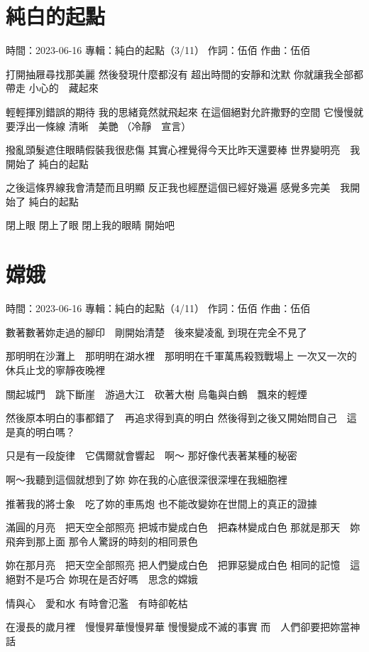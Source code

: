 \documentclass[UTF8,a4paper,oneside,twocolumn,12pt]{ctexbook}
\newcommand{\infopair}[2]{\textbullet #1：#2}
\newcommand{\zc}[1][伍佰]{\infopair{作詞}{#1}}
\newcommand{\zq}[1][伍佰]{\infopair{作曲}{#1}}
\newcommand{\zj}[1]{\infopair{專輯}{#1}}
\newcommand{\sj}[1]{\infopair{時間}{#1}}
\newenvironment{info}{\begin{flushleft}\kaishu
	}
	{\end{flushleft}\normalsize\yahei\par}
\newenvironment{lyric}{
	}
{}
\begin{document}
\section{純白的起點}
\begin{info}
	\sj{2023-06-16}
	\zj{純白的起點（3/11）}
	\zc
	\zq
\end{info}
\begin{lyric}%
	打開抽屜尋找那美麗
	然後發現什麼都沒有
	超出時間的安靜和沈默
	你就讓我全部都帶走
	小心的　藏起來

	輕輕揮別錯誤的期待
	我的思緒竟然就飛起來
	在這個絕對允許撒野的空間
	它慢慢就要浮出一條線
	清晰　美艷
	（冷靜　宣言）

	撥亂頭髮遮住眼睛假裝我很悲傷
	其實心裡覺得今天比昨天還要棒
	世界變明亮　我開始了
	純白的起點

	之後這條界線我會清楚而且明顯
	反正我也經歷這個已經好幾遍
	感覺多完美　我開始了
	純白的起點

	閉上眼
	閉上了眼
	閉上我的眼睛
	開始吧
\end{lyric}

\section{嫦娥}
\begin{info}
	\sj{2023-06-16}
	\zj{純白的起點（4/11）}
	\zc
	\zq
\end{info}
\begin{lyric}
	數著數著妳走過的腳印　剛開始清楚　後來變凌亂
	到現在完全不見了

	那明明在沙灘上　那明明在湖水裡　那明明在千軍萬馬殺戮戰場上
	一次又一次的休兵止戈的寧靜夜晚裡

	關起城門　跳下斷崖　游過大江　砍著大樹
	烏龜與白鶴　飄來的輕煙

	然後原本明白的事都錯了　再追求得到真的明白
	然後得到之後又開始問自己　這是真的明白嗎？

	只是有一段旋律　它偶爾就會響起　啊～
	那好像代表著某種的秘密

	啊～我聽到這個就想到了妳
	妳在我的心底很深很深埋在我細胞裡

	推著我的將士象　吃了妳的車馬炮
	也不能改變妳在世間上的真正的證據

	滿圓的月亮　把天空全部照亮
	把城市變成白色　把森林變成白色
	那就是那天　妳飛奔到那上面
	那令人驚訝的時刻的相同景色

	妳在那月亮　把天空全部照亮
	把人們變成白色　把罪惡變成白色
	相同的記憶　這絕對不是巧合
	妳現在是否好嗎　思念的嫦娥

	情與心　愛和水
	有時會氾濫　有時卻乾枯

	在漫長的歲月裡　慢慢昇華慢慢昇華
	慢慢變成不滅的事實
	而　人們卻要把妳當神話
\end{lyric}
\end{document}
